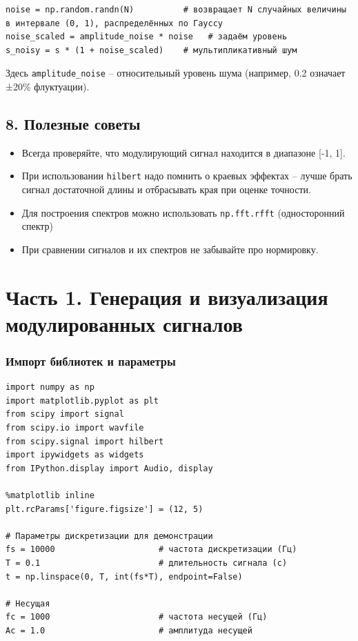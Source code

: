 \documentclass[12pt,a4paper,openany]{book}
\providecommand{\tightlist}{\setlength{\itemsep}{0pt}\setlength{\parskip}{0pt}}
\begin{document}
\begin{Verbatim}[fontsize=\small, breaklines, breakanywhere]
noise = np.random.randn(N)          # возвращает N случайных величины в интервале (0, 1), распределённых по Гауссу
noise_scaled = amplitude_noise * noise   # задаём уровень
s_noisy = s * (1 + noise_scaled)    # мультипликативный шум
\end{Verbatim}

Здесь \texttt{amplitude\_\allowbreak{}noise} -- относительный уровень шума (например, 0.2 означает ±20\% флуктуации).

\subsection*{8. Полезные советы}

\begin{itemize}
\tightlist
\item
  Всегда проверяйте, что модулирующий сигнал находится в диапазоне {[}-1, 1{]}.
\item
  При использовании \texttt{hilbert} надо помнить о краевых эффектах -- лучше брать сигнал достаточной длины и отбрасывать края при оценке точности.
\item
  Для построения спектров можно использовать \texttt{np.\allowbreak{}fft.\allowbreak{}rfft} (односторонний спектр)
\item
  При сравнении сигналов и их спектров не забывайте про нормировку.
\end{itemize}

\section*{Часть 1. Генерация и визуализация модулированных сигналов}

\subsubsection*{Импорт библиотек и параметры}

\begin{Verbatim}[fontsize=\small, breaklines, breakanywhere, frame=single, framesep=2mm]
import numpy as np
import matplotlib.pyplot as plt
from scipy import signal
from scipy.io import wavfile
from scipy.signal import hilbert
import ipywidgets as widgets
from IPython.display import Audio, display

%matplotlib inline
plt.rcParams['figure.figsize'] = (12, 5)

# Параметры дискретизации для демонстрации
fs = 10000                     # частота дискретизации (Гц)
T = 0.1                        # длительность сигнала (с)
t = np.linspace(0, T, int(fs*T), endpoint=False)

# Несущая
fc = 1000                      # частота несущей (Гц)
Ac = 1.0                       # амплитуда несущей
\end{Verbatim}
\end{document}
